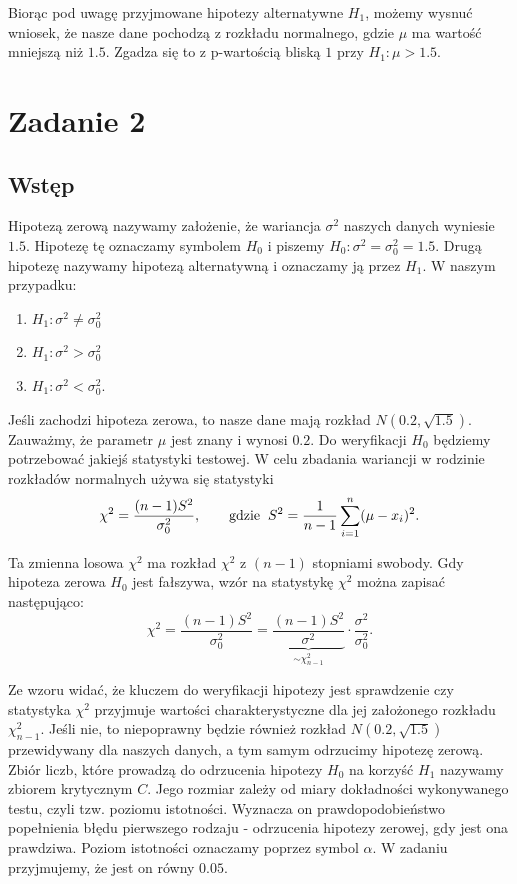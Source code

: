 \documentclass[12pt]{mwart}
\begin{document}
\noindent Biorąc pod uwagę przyjmowane hipotezy alternatywne $H_1$, możemy wysnuć wniosek, że nasze dane pochodzą z rozkładu normalnego, gdzie $\mu$ ma wartość mniejszą niż $1.5$. Zgadza się to z p-wartością bliską $1$ przy $H_1 \colon \mu >1.5$.
	
	
	
	\section{Zadanie 2}
	\subsection{Wstęp}
\noindent Hipotezą zerową nazywamy założenie, że wariancja $\sigma^{2}$ naszych danych wyniesie $1.5$. Hipotezę tę oznaczamy symbolem $H_0$ i piszemy $H_0 \colon \sigma^{2} = \sigma_0^2 = 1.5$. Drugą hipotezę nazywamy hipotezą alternatywną i oznaczamy ją przez $H_1$. W naszym przypadku:
	\begin{enumerate}[label=(\alph*)]
		\item $H_1 \colon \sigma^{2} \neq \sigma^{2}_0$
		\item $H_1 \colon \sigma^{2} > \sigma^{2}_0$
		\item $H_1 \colon \sigma^{2} < \sigma^{2}_0$. \\
	\end{enumerate} 
	
	
\noindent Jeśli zachodzi hipoteza zerowa, to nasze dane mają rozkład $N(0.2,\sqrt{1.5})$. Zauważmy, że parametr $\mu$ jest znany i wynosi $0.2$. Do weryfikacji $H_0$ będziemy potrzebować jakiejś statystyki testowej. W celu zbadania wariancji w rodzinie rozkładów normalnych używa się statystyki 
$$\chi^2 = \frac{(n-1)S^2}{\sigma_0^2}, \qquad \mathrm{gdzie} \hspace{2mm} S^2 = \frac{1}{n-1} \sum_{i=1}^{n}(\mu-x_i)^2.$$  
	
	\noindent Ta zmienna losowa $\chi^2$ ma rozkład $\chi^2$ z $(n-1)$ stopniami swobody. Gdy hipoteza zerowa $H_0$ jest fałszywa, wzór na statystykę $\chi^2$ można zapisać następująco:
$$\chi^2 = \frac{(n-1)S^2}{\sigma_0^2} = \underbrace{\frac{(n-1)S^2}{\sigma^2}}_{\sim \chi^2_{n-1}} \cdot \frac{\sigma^2}{\sigma_0^2}.$$

	\noindent Ze wzoru widać, że kluczem do weryfikacji hipotezy jest sprawdzenie czy statystyka $\chi^2$ przyjmuje wartości charakterystyczne dla jej założonego rozkładu $\chi^2_{n-1}$. Jeśli nie, to niepoprawny będzie również rozkład $N(0.2,\sqrt{1.5})$ przewidywany dla naszych danych, a tym samym odrzucimy hipotezę zerową. Zbiór liczb, które prowadzą do odrzucenia hipotezy $H_0$ na korzyść $H_1$ nazywamy zbiorem krytycznym $C$. Jego rozmiar zależy od miary dokładności wykonywanego testu, czyli tzw. poziomu istotności. Wyznacza on prawdopodobieństwo popełnienia błędu pierwszego rodzaju - odrzucenia hipotezy zerowej, gdy jest ona prawdziwa. Poziom istotności oznaczamy poprzez symbol $\alpha$. W zadaniu przyjmujemy, że jest on równy $0.05$. \\
	
\end{document}
